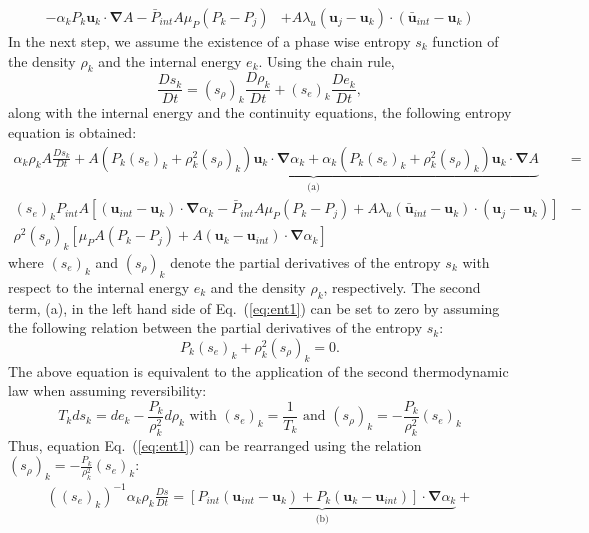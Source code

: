 \documentclass[preprint,10pt]{elsarticle}
\newcommand{\grad}{\mbold{\nabla}}
\newcommand{\mbold}[1]{\boldsymbol#1}
\newcommand{\eqt}[1]{Eq.~(\ref{#1})}                     %
\begin{document}
\begin{appendices}
\begin{align}
- \alpha_k P_k \mbold u_k \cdot \grad A 
 - \bar{P}_{int} A \mu_P \left(P_k-P_j \right) &+ A \lambda_u \left(\mbold u_j-\mbold u_k  \right) \cdot \left(\bar{\mbold u}_{int}-\mbold u_k \right)
\end{align}
In the next step, we assume the existence of a phase wise entropy $s_k$ function of the density $\rho_k$ and the internal energy $e_k$. Using the chain rule,
\begin{equation}
\frac{Ds_k}{Dt} = (s_\rho)_k \frac{D \rho_k}{Dt} + (s_e)_k \frac{De_k}{Dt},
\end{equation}
along with the internal energy and the continuity equations, the following entropy equation is obtained:
\begin{eqnarray}
\label{eq:ent1}
\alpha_k \rho_k A \frac{Ds_k}{Dt} + \underbrace{A \left( P_k (s_e)_k + \rho_k^2 (s_\rho)_k \right)\mbold u_k \cdot \grad \alpha_k + \alpha_k \left( P_k (s_e)_k + \rho_k^2 (s_\rho)_k \right) \mbold u_k \cdot \grad A}_\textrm{(a)} &= \nonumber\\
(s_e)_k P_{int}A \left[ (\mbold u_{int}-\mbold u_k)\cdot \grad \alpha_k - \bar{P}_{int} A \mu_P (P_k-P_j) + A \lambda_u (\bar{\mbold u}_{int}-\mbold u_k) \cdot (\mbold u_j-\mbold u_k)\right] &- \nonumber\\
\rho^2 (s_\rho)_k \left[ \mu_P A (P_k-P_j) + A(\mbold u_k-\mbold u_{int}) \cdot \grad \alpha_k\right] & 
\end{eqnarray}
where $(s_e)_k$ and $(s_\rho)_k$ denote the partial derivatives of the entropy $s_k$ with respect to the internal energy $e_k$ and the density $\rho_k$, respectively.
The second term, (a), in the left hand side of \eqt{eq:ent1} can be set to zero by assuming the following relation between the partial derivatives of the entropy $s_k$:
\begin{equation}
\label{eq:ent2}
 P_k (s_e)_k + \rho_k^2 (s_\rho)_k = 0 .
\end{equation} 
The above equation is equivalent to the application of the second thermodynamic law when assuming reversibility:
\begin{equation}
T_k ds_k = de_k - \frac{P_k}{\rho_k^2} d \rho_k \text{ with } (s_e)_k = \frac{1}{T_k} \text{ and } (s_\rho)_k = - \frac{P_k}{\rho_k^2} (s_e)_k
\end{equation}
Thus, equation \eqt{eq:ent1} can be rearranged using the relation $(s_\rho)_k = - \frac{P_k}{\rho_k^2} (s_e)_k$:
\begin{eqnarray}
\label{eq:ent3}
((s_e)_k)^{-1} \alpha_k \rho_k \frac{Ds}{Dt} = \underbrace{\left[ P_{int} (\mbold u_{int}-\mbold u_k) + P_k (\mbold u_k-\mbold u_{int}) \right] \cdot \grad \alpha_k}_\textrm{(b)} + \nonumber\\ 

\end{eqnarray}
\end{appendices}
\end{document}
